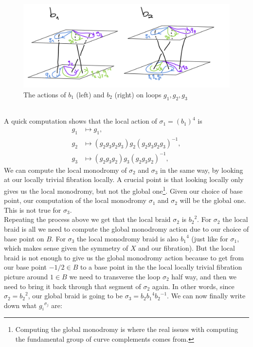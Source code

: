 \documentclass[oneside]{amsart}
\theoremstyle{definition}
\theoremstyle{definition}
\theoremstyle{definition}
\theoremstyle{definition}
\begin{document}
\begin{figure}[!h]
    \centering
    \includegraphics[width=14cm]{rank2exmp/braidgenerators.png}
    \caption{The actions of $b_1$ (left) and $b_2$ (right) on loops $g_1,g_2,g_3$}
    \label{braidgenaction}
\end{figure}\\
A quick computation shows that the local action of $\sigma_1 = (b_1)^4$ is 
\begin{align*}
    g_1 &\mapsto g_1, \\
    g_2 &\mapsto (g_2 g_3 g_2 g_3) g_2 (g_2 g_3 g_2 g_3)^{-1}, \\
    g_3 &\mapsto (g_2 g_3 g_2) g_3 (g_2 g_3 g_2)^{-1}, 
\end{align*}
We can compute the local monodromy of $\sigma_2$ and $\sigma_3$ in the same way, by looking at our locally trivial fibration locally. A crucial point is that looking locally only gives us the local monodromy, but not the global one\footnote{Computing the global monodromy is where the real issues with computing the fundamental group of curve complements comes from.}. Given our choice of base point, our computation of the local monodromy $\sigma_1$ and $\sigma_2$ will be the global one. This is not true for $\sigma_3$. \\
\newline
Repeating the process above we get that the local braid $\sigma_2$ is ${b_2}^2$. For $\sigma_2$ the local braid is all we need to compute the global monodromy action due to our choice of base point on $B$. For $\sigma_3$ the local monodromy braid is also ${b_1}^4$ (just like for $\sigma_1$, which makes sense given the symmetry of $X$ and our fibration). But the local braid is not enough to give us the global monodromy action because to get from our base point $-1/2 \in B$ to a base point in the the local locally trivial fibration picture around $1 \in B$ we need to transverse the loop $\sigma_2$ half way, and then we need to bring it back through that segment of $\sigma_2$ again. In other words, since $\sigma_2 = {b_2}^2$, our global braid is going to be $\sigma_3 = b_2 {b_1}^4 {b_2}^{-1}$. We can now finally write down what ${g_i}^{\sigma_j}$ are:
\end{document}
